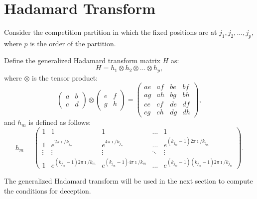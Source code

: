\section{Hadamard Transform}
Consider the competition partition in which the fixed positions
are at $j_1,j_2,\ldots,j_p$, where $p$ is the order of the partition.
\begin{definition}
Define the generalized Hadamard transform matrix $H$ as:
\begin{equation} 
H=h_1 \otimes h_2 \otimes \ldots \otimes h_p,
\end{equation}
where $\otimes$ is the tensor product:
\begin{equation}
\left(\begin{array}{cc}
	a & b\\
	c & d
	\end{array} \right)
\otimes \left(\begin{array}{cc}
	e & f\\
	g &h
	\end{array} \right)
= \left(\begin{array}{cccc}
	ae& af& be& bf\\
	ag& ah& bg& bh \\
	ce& cf& de& df \\
	cg& ch& dg& dh
\end{array}\right),
\end{equation}
and $h_m$ is defined as follows:
\begin{equation}
h_m = \left(\begin{array}{ccccc}
		1 & 1& 1& \ldots &1 \\
		1 & e^{2 \pi \imath /k_{j_m}} & e^{4 \pi \imath/k_{j_m}} &\ldots &
			e^{(k_{j_m}-1) 2 \pi \imath/k_{j_m}} \\
		\vdots &\vdots &\vdots &\ddots &\vdots \\
		1 & e^{(k_{j_m}-1) 2 \pi \imath/k_m} &
			e^{(k_{j_m}-1) 4 \pi \imath/k_m} &\ldots&
			e^{(k_{j_m}-1) (k_{j_m}-1) 2 \pi \imath/k_{j_m}}
	\end{array}
	\right).
\end{equation}
\end{definition}
The generalized Hadamard transform will be used in the next section to
compute the conditions for deception.

